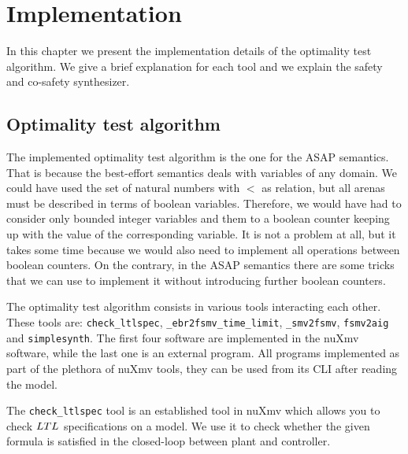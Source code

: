 
\chapter{Implementation} \label{chapt:implementation}

In this chapter we present the implementation details of the optimality test algorithm.
We give a brief explanation for each tool and we explain the safety and co-safety synthesizer.

\section{Optimality test algorithm}

The implemented optimality test algorithm is the one for the ASAP semantics.
That is because the best-effort semantics deals with variables of any domain. We could have used the set of natural numbers with $<$ as relation, but all arenas must be described in terms of boolean variables. 
Therefore, we would have had to consider only bounded integer variables and them to a boolean counter keeping up with the value of the corresponding variable.
It is not a problem at all, but it takes some time because we would also need to implement all operations between boolean counters.
On the contrary, in the ASAP semantics there are some tricks that we can use to implement it without introducing further boolean counters. 

The optimality test algorithm consists in various tools interacting each other.
These tools are: \lstinline{check_ltlspec}, \lstinline{_ebr2fsmv_time_limit}, \lstinline{_smv2fsmv}, \lstinline{fsmv2aig} and \lstinline{simplesynth}.
The first four software are implemented in the nuXmv software, while the last one is an external program.
All programs implemented as part of the plethora of nuXmv tools, they can be used from its CLI after reading the model.

The \lstinline{check_ltlspec} tool is an established tool in nuXmv which allows you to check $LTL$ specifications on a model.
We use it to check whether the given formula is satisfied in the closed-loop between plant and controller.

